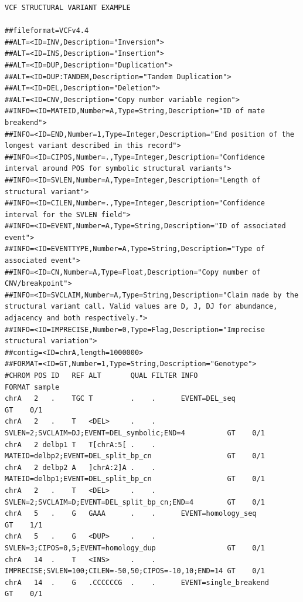 \documentclass[8pt]{article}
\begin{document}
\pagebreak
\footnotesize
\begin{landscape}
\begin{verbatim}
VCF STRUCTURAL VARIANT EXAMPLE

##fileformat=VCFv4.4
##ALT=<ID=INV,Description="Inversion">
##ALT=<ID=INS,Description="Insertion">
##ALT=<ID=DUP,Description="Duplication">
##ALT=<ID=DUP:TANDEM,Description="Tandem Duplication">
##ALT=<ID=DEL,Description="Deletion">
##ALT=<ID=CNV,Description="Copy number variable region">
##INFO=<ID=MATEID,Number=A,Type=String,Description="ID of mate breakend">
##INFO=<ID=END,Number=1,Type=Integer,Description="End position of the longest variant described in this record">
##INFO=<ID=CIPOS,Number=.,Type=Integer,Description="Confidence interval around POS for symbolic structural variants">
##INFO=<ID=SVLEN,Number=A,Type=Integer,Description="Length of structural variant">
##INFO=<ID=CILEN,Number=.,Type=Integer,Description="Confidence interval for the SVLEN field">
##INFO=<ID=EVENT,Number=A,Type=String,Description="ID of associated event">
##INFO=<ID=EVENTTYPE,Number=A,Type=String,Description="Type of associated event">
##INFO=<ID=CN,Number=A,Type=Float,Description="Copy number of CNV/breakpoint">
##INFO=<ID=SVCLAIM,Number=A,Type=String,Description="Claim made by the structural variant call. Valid values are D, J, DJ for abundance, adjacency and both respectively.">
##INFO=<ID=IMPRECISE,Number=0,Type=Flag,Description="Imprecise structural variation">
##contig=<ID=chrA,length=1000000>
##FORMAT=<ID=GT,Number=1,Type=String,Description="Genotype">
#CHROM POS ID   REF ALT       QUAL FILTER INFO                                             FORMAT sample
chrA   2   .    TGC T         .    .      EVENT=DEL_seq                                        GT    0/1
chrA   2   .    T   <DEL>     .    .      SVLEN=2;SVCLAIM=DJ;EVENT=DEL_symbolic;END=4          GT    0/1
chrA   2 delbp1 T   T[chrA:5[ .    .      MATEID=delbp2;EVENT=DEL_split_bp_cn                  GT    0/1
chrA   2 delbp2 A   ]chrA:2]A .    .      MATEID=delbp1;EVENT=DEL_split_bp_cn                  GT    0/1
chrA   2   .    T   <DEL>     .    .      SVLEN=2;SVCLAIM=D;EVENT=DEL_split_bp_cn;END=4        GT    0/1
chrA   5   .    G   GAAA      .    .      EVENT=homology_seq                                   GT    1/1
chrA   5   .    G   <DUP>     .    .      SVLEN=3;CIPOS=0,5;EVENT=homology_dup                 GT    0/1
chrA   14  .    T   <INS>     .    .      IMPRECISE;SVLEN=100;CILEN=-50,50;CIPOS=-10,10;END=14 GT    0/1
chrA   14  .    G   .CCCCCCG  .    .      EVENT=single_breakend                                GT    0/1
\end{verbatim}
\end{landscape}
\pagebreak
\normalsize
\end{document}
